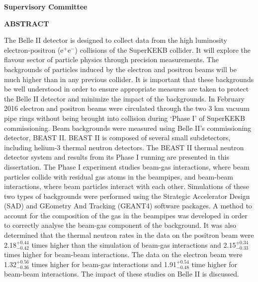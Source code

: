 \newpage
{}

\noindent \textbf{Supervisory Committee}
\tpbreak
\panel

\begin{center}
\textbf{ABSTRACT}
\end{center}

The Belle II detector is designed to collect data from the high luminosity electron-positron (e$^+$e$^-$) collisions of the SuperKEKB collider. It will explore the flavour sector of particle physics through precision measurements. The backgrounds of particles induced by the electron and positron beams will be much higher than in any previous \epem collider. It is important that these backgrounds be well understood in order to ensure appropriate measures are taken to protect the Belle II detector and minimize the impact of the backgrounds. In February 2016 electron and positron beams were circulated through the two 3 km vacuum pipe rings without being brought into collision during `Phase I' of SuperKEKB commissioning. Beam backgrounds were measured using Belle II's commissioning detector, BEAST II. BEAST II is composed of several small subdetectors, including helium-3 thermal neutron detectors. The BEAST II thermal neutron detector system and results from its Phase I running are presented in this dissertation. The Phase I experiment studies beam-gas interactions, where beam particles collide with residual gas atoms in the beampipes, and beam-beam interactions, where beam particles interact with each other. Simulations of these two types of backgrounds were performed using the Strategic Accelerator Design (SAD) and GEometry And Tracking (GEANT4) software packages. A method to account for the composition of the gas in the beampipes was developed in order to correctly analyse the beam-gas component of the background. It was also determined that the thermal neutron rates in the data on the positron beam were 2.18$^{+0.44}_{-0.42}$ times higher than the simulation of beam-gas interactions and 2.15$^{+0.34}_{-0.33}$ times higher for beam-beam interactions. The data on the electron beam were 1.32$^{+0.56}_{-0.36}$ times higher for beam-gas interactions and 1.91$^{+0.54}_{-0.48}$ time higher for beam-beam interactions. The impact of these studies on Belle II is discussed.





